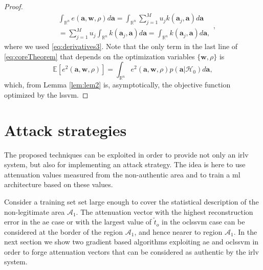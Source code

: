 \documentclass[draftcls,onecolumn,12pt]{IEEEtran}
\newcommand{\Exp}[1]{\mathbb{E}\left[#1\right]}
\begin{document}
\begin{proof}
\begin{equation}
\begin{aligned}
		&\int_{\mathbb{R}^n} e(\mathbf{a},\mathbf{w},\rho) d\mathbf{a} = \int_{\mathbb{R}^n} \sum_{j=1}^{M} u_j k(\bm{a}_j,\bm{a})d\mathbf{a} \\
		&= \sum_{j=1}^{M} u_j \int_{\mathbb{R}^n} k(\bm{a}_j,\bm{a})d\mathbf{a} = \int_{\mathbb{R}^n} k(\bm{a}_j,\bm{a})d\mathbf{a},
\end{aligned},
\end{equation}
where we used \eqref{eq:derivatives3}.
Note that the only term in the last line of \eqref{eq:coreTheorem} that depends on the optimization variables $\{\mathbf{w}, \rho \}$  is 
\begin{equation}
		\Exp{  e^2(\mathbf{a}, \mathbf{w}, \rho)} = \int_{\mathbb{R}^n} e^2(\mathbf{a},\mathbf{w},\rho) p(\mathbf{a}|\mathcal{H}_0) d\mathbf{a},
\end{equation}
which, from Lemma \ref{lem:lem2} is, asymptotically, the objective function optimized by the \ac{lssvm}.
\end{proof}


\section{Attack strategies}
\label{sec:attack}
The proposed techniques can be exploited in order to provide not only an \ac{irlv} system, but also for implementing an attack strategy. The idea is here to use attenuation values measured from the non-authentic area and to train a \ac{ml} architecture based on these values.

Consider a training set set large enough to cover the statistical description of the non-legitimate area $\mathcal{A}_1$. The attenuation vector with the highest reconstruction error in the \ac{ae} case or with the largest value of $\tilde{t}_o$ in the \ac{oclssvm} case can be considered at the border of the region $\mathcal{A}_1$, and hence nearer to region $\mathcal{A}_1$. In the next section we show two gradient based algorithms exploiting \ac{ae} and \ac{oclssvm} in order to forge attenuation vectors that can be considered as authentic by the \ac{irlv} system.
\end{document}
